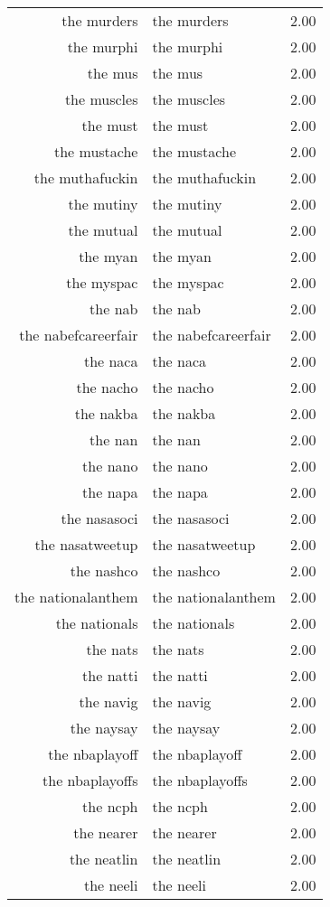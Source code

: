 \begin{table}[ht]
\begin{tabular}{rlr}
  the murders & the murders & 2.00 \\ 
  the murphi & the murphi & 2.00 \\ 
  the mus & the mus & 2.00 \\ 
  the muscles & the muscles & 2.00 \\ 
  the must & the must & 2.00 \\ 
  the mustache & the mustache & 2.00 \\ 
  the muthafuckin & the muthafuckin & 2.00 \\ 
  the mutiny & the mutiny & 2.00 \\ 
  the mutual & the mutual & 2.00 \\ 
  the myan & the myan & 2.00 \\ 
  the myspac & the myspac & 2.00 \\ 
  the nab & the nab & 2.00 \\ 
  the nabefcareerfair & the nabefcareerfair & 2.00 \\ 
  the naca & the naca & 2.00 \\ 
  the nacho & the nacho & 2.00 \\ 
  the nakba & the nakba & 2.00 \\ 
  the nan & the nan & 2.00 \\ 
  the nano & the nano & 2.00 \\ 
  the napa & the napa & 2.00 \\ 
  the nasasoci & the nasasoci & 2.00 \\ 
  the nasatweetup & the nasatweetup & 2.00 \\ 
  the nashco & the nashco & 2.00 \\ 
  the nationalanthem & the nationalanthem & 2.00 \\ 
  the nationals & the nationals & 2.00 \\ 
  the nats & the nats & 2.00 \\ 
  the natti & the natti & 2.00 \\ 
  the navig & the navig & 2.00 \\ 
  the naysay & the naysay & 2.00 \\ 
  the nbaplayoff & the nbaplayoff & 2.00 \\ 
  the nbaplayoffs & the nbaplayoffs & 2.00 \\ 
  the ncph & the ncph & 2.00 \\ 
  the nearer & the nearer & 2.00 \\ 
  the neatlin & the neatlin & 2.00 \\ 
  the neeli & the neeli & 2.00 \\ 

\end{tabular}
\end{table}
